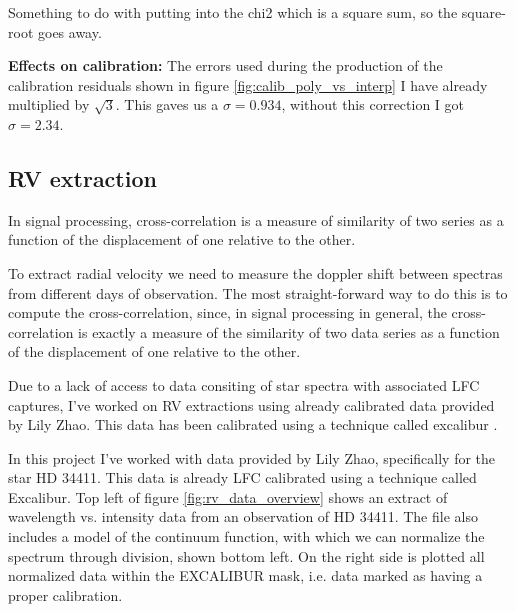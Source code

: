      Something to do with putting into the chi2 which is a square sum, so the square-root goes away. 

    \bigbreak

    \noindent \textbf{Effects on calibration:} \newline
    The errors used during the production of the calibration residuals shown in figure \ref{fig:calib_poly_vs_interp} I have already multiplied by $\sqrt{3}$. This gaves us a $\sigma = 0.934$, without this correction I got $\sigma = 2.34$. 


\subsection{RV extraction}

    

    In signal processing, cross-correlation is a measure of similarity of two series as a function 
    of the displacement of one relative to the other.

    To extract radial velocity we need to measure the doppler shift between spectras from different days of observation. The most straight-forward way to do this is to compute the cross-correlation, since, in signal processing in general, the cross-correlation is exactly a measure of the similarity of two data series as a function of the displacement of one relative to the other.

    Due to a lack of access to data consiting of star spectra with associated LFC captures, I've worked on RV extractions using already calibrated data provided by Lily Zhao. This data has been calibrated using a technique called excalibur \cite{zhao2021excalibur}.

    In this project I've worked with data provided by Lily Zhao, specifically for the star HD 34411. This data is already LFC calibrated using a technique called Excalibur. Top left of figure \ref*{fig:rv_data_overview} shows an extract of wavelength vs. intensity data from an observation of HD 34411. The file also includes a model of the continuum function, with which we can normalize the spectrum through division, shown bottom left. On the right side is plotted all normalized data within the EXCALIBUR mask, i.e. data marked as having a proper calibration. 


